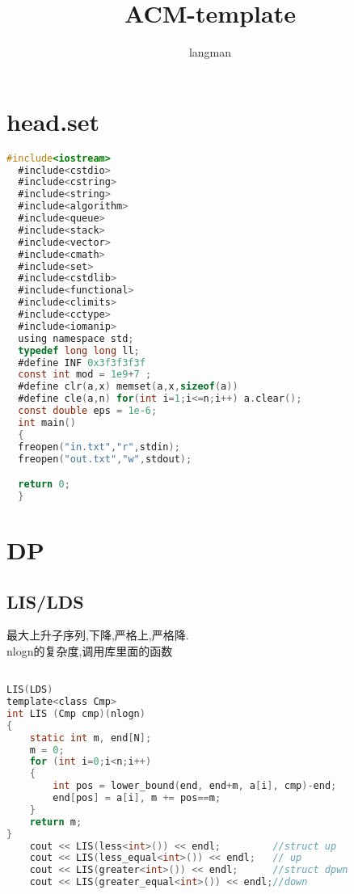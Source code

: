 \documentclass[a4paper,11pt]{article}
\author{langman}
\title{ACM-template}
\begin{document}
\maketitle
\section{head.set}

\begin{lstlisting}[language = C]
  #include<iostream>
  #include<cstdio>
  #include<cstring>
  #include<string>
  #include<algorithm>
  #include<queue>
  #include<stack>
  #include<vector>
  #include<cmath>
  #include<set>
  #include<cstdlib>
  #include<functional>
  #include<climits>
  #include<cctype>
  #include<iomanip>
  using namespace std;
  typedef long long ll;
  #define INF 0x3f3f3f3f
  const int mod = 1e9+7 ;
  #define clr(a,x) memset(a,x,sizeof(a))
  #define cle(a,n) for(int i=1;i<=n;i++) a.clear();
  const double eps = 1e-6;
  int main()
  {
  freopen("in.txt","r",stdin);
  freopen("out.txt","w",stdout);

  return 0;
  }

\end{lstlisting}
\section{DP}
\subsection{LIS/LDS}
\begin{CJK}{UTF8}{gkai}
最大上升子序列,下降,严格上,严格降.\\
nlogn的复杂度,调用库里面的函数\\
\end{CJK}
\begin{lstlisting}[language = C]

LIS(LDS)
template<class Cmp>
int LIS (Cmp cmp)(nlogn)
{
    static int m, end[N];
    m = 0;
    for (int i=0;i<n;i++)
    {
        int pos = lower_bound(end, end+m, a[i], cmp)-end;
        end[pos] = a[i], m += pos==m;
    }
    return m;
}
    cout << LIS(less<int>()) << endl;         //struct up
    cout << LIS(less_equal<int>()) << endl;   // up
    cout << LIS(greater<int>()) << endl;      //struct dpwn
    cout << LIS(greater_equal<int>()) << endl;//down
\end{lstlisting}
\end{document}
